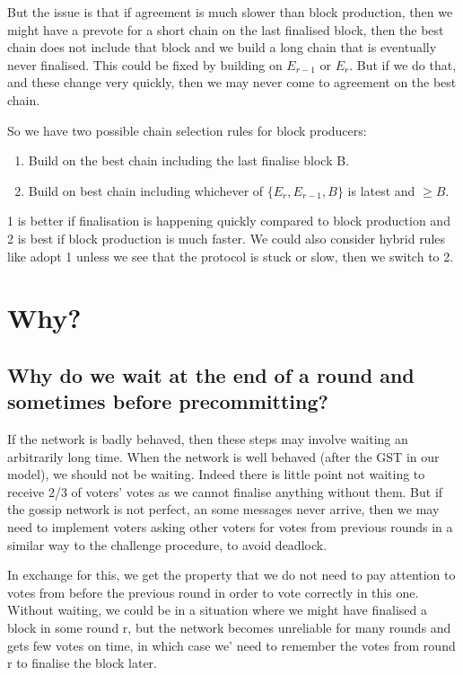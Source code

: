 \documentclass{article}
\begin{document}
{But the issue is that if agreement is much slower than block production, then we might have a prevote for a short chain on the last finalised block, then the best chain does not include that block and we build a long chain that is eventually never finalised. This could be fixed by building on $E_{r-1}$ or $E_r$. But if we do that, and these change very quickly, then we may never come to agreement on the best chain. 

So we have two possible chain selection rules for block producers:

\begin{enumerate}
\item Build on the best chain including the last finalise block B.
\item Build on best chain including whichever of $\{E_r,E_{r-1},B\}$ is latest and $\geq B$.
\end{enumerate}

1 is better if finalisation is happening quickly compared to block production and 2 is best if block production is much faster. We could also consider hybrid rules like adopt 1 unless we see that the protocol is stuck or slow, then we switch to 2.

\section{Why?}

\subsection{Why do we wait at the end of a round and sometimes before precommitting?}

If the network  is badly behaved, then these steps may involve waiting an arbitrarily long time. When the network is well behaved (after the GST in our model), we should not be waiting. Indeed there is little point not waiting to receive 2/3 of voters' votes as we cannot finalise anything without them. But if the gossip network is not perfect, an some messages never arrive, then we may need to implement voters asking other voters for votes from previous rounds in a similar way to the challenge procedure, to avoid deadlock.

In exchange for this, we get the property that we do not need to pay attention to votes from before the previous round in order to vote correctly in this one. Without waiting, we could be in a situation where we might have finalised a block in some round r, but the network becomes unreliable for many rounds and gets few votes on time, in which case we' need to remember the votes from round r to finalise the block later. 

}
\end{document}
